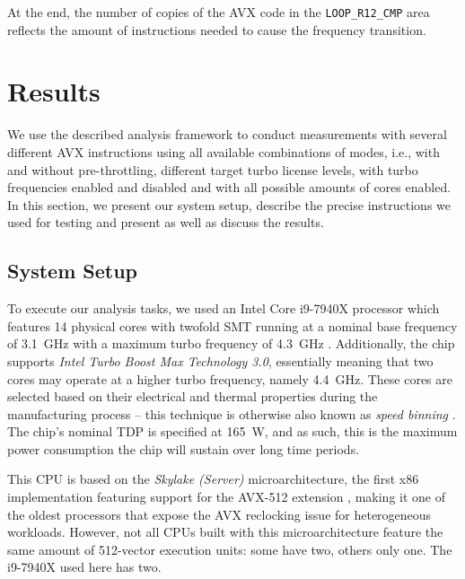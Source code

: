 At the end, the number of copies of the \gls{AVX} code in the \texttt{LOOP\_R12\_CMP} area reflects the amount of instructions needed to cause the frequency transition.

\section{Results}
\label{sec:analysis:results}

We use the described analysis framework to conduct measurements with several different \gls{AVX} instructions using all available combinations of modes, i.e., with and without pre-throttling, different target turbo license levels, with turbo frequencies enabled and disabled and with all possible amounts of cores enabled. In this section, we present our system setup, describe the precise instructions we used for testing and present as well as discuss the results.

\subsection{System Setup}
\label{sec:analysis:results:systemsetup}

To execute our analysis tasks, we used an Intel Core i9-7940X processor which features 14 physical cores with twofold \gls{SMT} running at a nominal base frequency of \SI{3.1}{\giga\hertz} with a maximum turbo frequency of \SI{4.3}{\giga\hertz} \cite{intel7940x}. Additionally, the chip supports \textit{Intel Turbo Boost Max Technology 3.0}, essentially meaning that two cores may operate at a higher turbo frequency, namely \SI{4.4}{\giga\hertz}. These cores are selected based on their electrical and thermal properties during the manufacturing process \cite{intelxeonscalabledeepdive} -- this technique is otherwise also known as \textit{speed binning} \cite{lopata2012speed}. The chip's nominal \gls{TDP} is specified at \SI{165}{\watt}, and as such, this is the maximum power consumption the chip will sustain over long time periods.

This \gls{CPU} is based on the \textit{Skylake (Server)} microarchitecture, the first x86 implementation featuring support for the \gls{AVX-512} extension \cite{intelxeonscalabledeepdive}, making it one of the oldest processors that expose the \gls{AVX} reclocking issue for heterogeneous workloads. However, not all \glspl{CPU} built with this microarchitecture feature the same amount of \SI{512}{\bit}-vector execution units: some have two, others only one. The i9-7940X used here has two.

